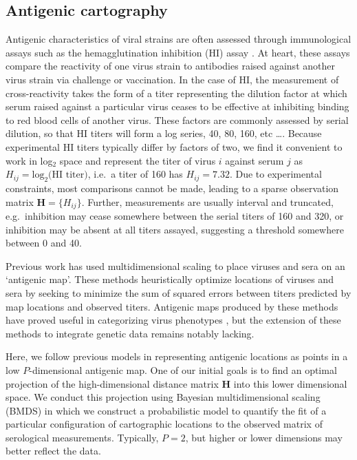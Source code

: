 \documentclass[11pt,oneside,letterpaper]{article}
\begin{document}
\subsection*{Antigenic cartography}

Antigenic characteristics of viral strains are often assessed through immunological assays such as the hemagglutination inhibition (HI) assay \cite{Hirst43}.  
At heart, these assays compare the reactivity of one virus strain to antibodies raised against another virus strain via challenge or vaccination.  
In the case of HI, the measurement of cross-reactivity takes the form of a titer representing the dilution factor at which serum raised against a particular virus ceases to be effective at inhibiting binding to red blood cells of another virus.  
These factors are commonly assessed by serial dilution, so that HI titers will form a log series, 40, 80, 160, etc \dots.
Because experimental HI titers typically differ by factors of two, we find it convenient to work in log$_2$ space and represent the titer of virus $i$ against serum $j$ as $H_{ij} = \mathrm{log}_2 \mbox{(HI titer)}$, i.e.\ a titer of 160 has $H_{ij} = 7.32$.
Due to experimental constraints, most comparisons cannot be made, leading to a sparse observation matrix $\mathbf{H} = \{H_{ij}\}$.  
Further, measurements are usually interval and truncated, e.g.\ inhibition may cease somewhere between the serial titers of 160 and 320, or inhibition may be absent at all titers assayed, suggesting a threshold somewhere between 0 and 40.  

Previous work \cite{Smith04, Cai10} has used multidimensional scaling to place viruses and sera on an `antigenic map'.  
These methods heuristically optimize locations of viruses and sera by seeking to minimize the sum of squared errors between titers predicted by map locations and observed titers.  
Antigenic maps produced by these methods have proved useful in categorizing virus phenotypes \cite{Smith04}, but the extension of these methods to integrate genetic data remains notably lacking.

Here, we follow previous models in representing antigenic locations as points in a low $P$-dimensional antigenic map. 
One of our initial goals is to find an optimal projection of the high-dimensional distance matrix $\mathbf{H}$ into this lower dimensional space. 
We conduct this projection using Bayesian multidimensional scaling (BMDS) \cite{Oh01} in which we construct a probabilistic model to quantify the fit of a particular configuration of cartographic locations to the observed matrix of serological measurements.
Typically, $P = 2$, but higher or lower dimensions may better reflect the data. 
\end{document}
